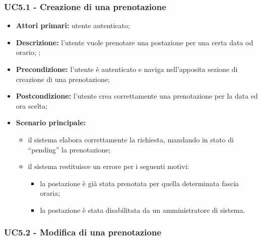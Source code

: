 \subsubsection{UC5.1 - Creazione di una prenotazione}

\begin{itemize}
\item \textbf{Attori primari:} utente autenticato;
\item \textbf{Descrizione:} l’utente vuole prenotare una postazione per una certa data od orario;
;\item \textbf{Precondizione:} l’utente è autenticato e naviga nell’apposita sezione di creazione di una prenotazione;
\item \textbf{Postcondizione:} l’utente crea correttamente una prenotazione per la data ed ora scelta;\item \textbf{Scenario principale:} 
	\begin{itemize}
		\item il sistema elabora correttamente la richiesta, mandando in stato di “pending” la prenotazione;
		\item il sistema restituisce un errore per i seguenti motivi:
		\begin{itemize}
			\item la postazione è già stata prenotata per quella determinata fascia oraria;
			\item la postazione è stata disabilitata da un amministratore di sistema.	
		\end{itemize}
	\end{itemize}
\end{itemize}

\subsubsection{UC5.2 - Modifica di una prenotazione}

